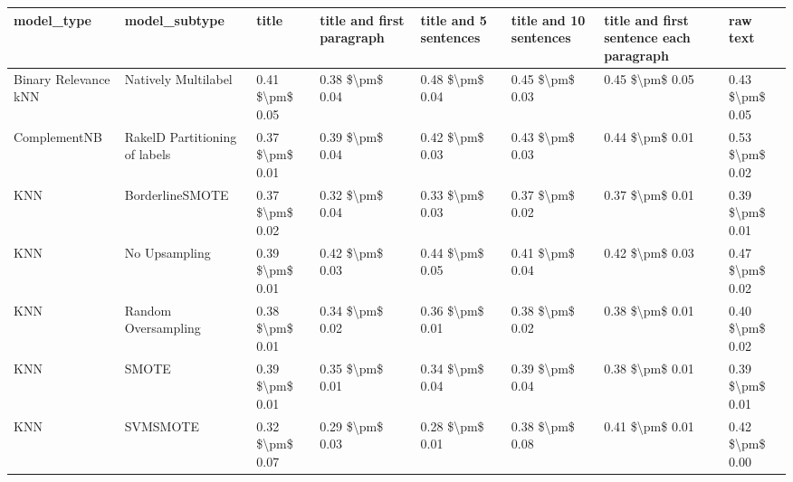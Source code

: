 \begin{tabular}{llllllll}
\toprule
                     model\_type &                 model\_subtype &           title & title and first paragraph & title and 5 sentences & title and 10 sentences & title and first sentence each paragraph &            raw text \\
\midrule
           Binary Relevance kNN &           Natively Multilabel & 0.41 \$\textbackslash pm\$ 0.05 &           0.38 \$\textbackslash pm\$ 0.04 &       0.48 \$\textbackslash pm\$ 0.04 &        0.45 \$\textbackslash pm\$ 0.03 &                         0.45 \$\textbackslash pm\$ 0.05 &     0.43 \$\textbackslash pm\$ 0.05 \\
                   ComplementNB & RakelD Partitioning of labels & 0.37 \$\textbackslash pm\$ 0.01 &           0.39 \$\textbackslash pm\$ 0.04 &       0.42 \$\textbackslash pm\$ 0.03 &        0.43 \$\textbackslash pm\$ 0.03 &                         0.44 \$\textbackslash pm\$ 0.01 &     0.53 \$\textbackslash pm\$ 0.02 \\
                            KNN &               BorderlineSMOTE & 0.37 \$\textbackslash pm\$ 0.02 &           0.32 \$\textbackslash pm\$ 0.04 &       0.33 \$\textbackslash pm\$ 0.03 &        0.37 \$\textbackslash pm\$ 0.02 &                         0.37 \$\textbackslash pm\$ 0.01 &     0.39 \$\textbackslash pm\$ 0.01 \\
                            KNN &                 No Upsampling & 0.39 \$\textbackslash pm\$ 0.01 &           0.42 \$\textbackslash pm\$ 0.03 &       0.44 \$\textbackslash pm\$ 0.05 &        0.41 \$\textbackslash pm\$ 0.04 &                         0.42 \$\textbackslash pm\$ 0.03 &     0.47 \$\textbackslash pm\$ 0.02 \\
                            KNN &           Random Oversampling & 0.38 \$\textbackslash pm\$ 0.01 &           0.34 \$\textbackslash pm\$ 0.02 &       0.36 \$\textbackslash pm\$ 0.01 &        0.38 \$\textbackslash pm\$ 0.02 &                         0.38 \$\textbackslash pm\$ 0.01 &     0.40 \$\textbackslash pm\$ 0.02 \\
                            KNN &                         SMOTE & 0.39 \$\textbackslash pm\$ 0.01 &           0.35 \$\textbackslash pm\$ 0.01 &       0.34 \$\textbackslash pm\$ 0.04 &        0.39 \$\textbackslash pm\$ 0.04 &                         0.38 \$\textbackslash pm\$ 0.01 &     0.39 \$\textbackslash pm\$ 0.01 \\
                            KNN &                      SVMSMOTE & 0.32 \$\textbackslash pm\$ 0.07 &           0.29 \$\textbackslash pm\$ 0.03 &       0.28 \$\textbackslash pm\$ 0.01 &        0.38 \$\textbackslash pm\$ 0.08 &                         0.41 \$\textbackslash pm\$ 0.01 &     0.42 \$\textbackslash pm\$ 0.00 \\

\end{tabular}

